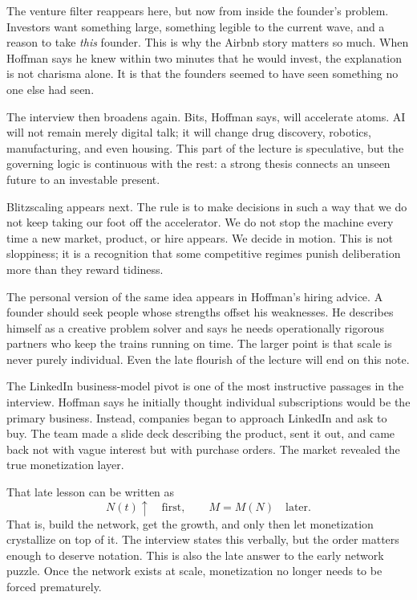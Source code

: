 The venture filter reappears here, but now from inside the founder's problem. Investors want something large, something legible to the current wave, and a reason to take \emph{this} founder. This is why the Airbnb story matters so much. When Hoffman says he knew within two minutes that he would invest, the explanation is not charisma alone. It is that the founders seemed to have seen something no one else had seen.

The interview then broadens again. Bits, Hoffman says, will accelerate atoms. AI will not remain merely digital talk; it will change drug discovery, robotics, manufacturing, and even housing. This part of the lecture is speculative, but the governing logic is continuous with the rest: a strong thesis connects an unseen future to an investable present.

Blitzscaling appears next. The rule is to make decisions in such a way that we do not keep taking our foot off the accelerator. We do not stop the machine every time a new market, product, or hire appears. We decide in motion. This is not sloppiness; it is a recognition that some competitive regimes punish deliberation more than they reward tidiness.

The personal version of the same idea appears in Hoffman's hiring advice. A founder should seek people whose strengths offset his weaknesses. He describes himself as a creative problem solver and says he needs operationally rigorous partners who keep the trains running on time. The larger point is that scale is never purely individual. Even the late flourish of the lecture will end on this note.

The LinkedIn business-model pivot is one of the most instructive passages in the interview. Hoffman says he initially thought individual subscriptions would be the primary business. Instead, companies began to approach LinkedIn and ask to buy. The team made a slide deck describing the product, sent it out, and came back not with vague interest but with purchase orders. The market revealed the true monetization layer.

That late lesson can be written as
\begin{equation}
N(t)\uparrow \quad \text{first}, \qquad M=M(N) \quad \text{later}.
\end{equation}
That is, build the network, get the growth, and only then let monetization crystallize on top of it. The interview states this verbally, but the order matters enough to deserve notation. This is also the late answer to the early network puzzle. Once the network exists at scale, monetization no longer needs to be forced prematurely.

